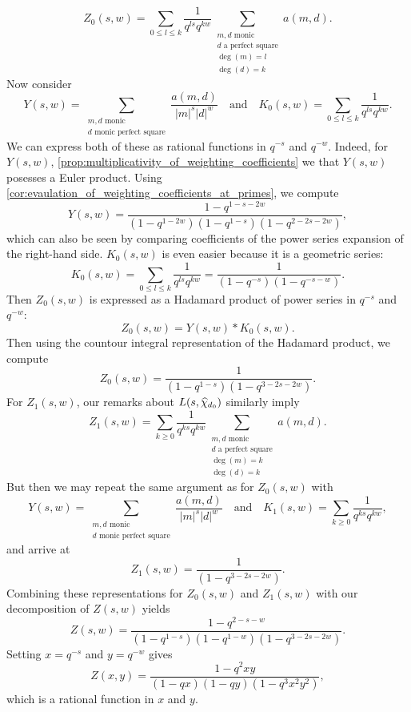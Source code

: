 \documentclass[12pt,reqno,oneside]{amsart}
\begin{document}
    \[
        Z_{0}(s,w) = \sum_{0 \le l \le k}\frac{1}{q^{ls}q^{kw}}\sum_{\substack{\text{$m,d$ monic} \\ \text{$d$ a perfect square} \\ \deg(m) = l \\ \deg(d) = k}}a(m,d).
    \]
    Now consider
    \[
        Y(s,w) = \sum_{\substack{\text{$m,d$ monic} \\ \text{$d$ monic perfect square}}}\frac{a(m,d)}{|m|^{s}|d|^{w}} \quad \text{and} \quad K_{0}(s,w) = \sum_{0 \le l \le k}\frac{1}{q^{ls}q^{kw}}.
    \]
    We can express both of these as rational functions in $q^{-s}$ and $q^{-w}$. Indeed, for $Y(s,w)$, \cref{prop:multiplicativity_of_weighting_coefficients}  we that $Y(s,w)$ posesses a Euler product. Using \cref{cor:evaulation_of_weighting_coefficients_at_primes}, we compute
    \[
        Y(s,w) = \frac{1-q^{1-s-2w}}{(1-q^{1-2w})(1-q^{1-s})(1-q^{2-2s-2w})},
    \]
    which can also be seen by comparing coefficients of the power series expansion of the right-hand side. $K_{0}(s,w)$ is even easier because it is a geometric series:
    \[
        K_{0}(s,w) = \sum_{0 \le l \le k}\frac{1}{q^{ls}q^{kw}} = \frac{1}{(1-q^{-s})(1-q^{-s-w})}.
    \]
    Then $Z_{0}(s,w)$ is expressed as a Hadamard product of power series in $q^{-s}$ and $q^{-w}$:
    \[
        Z_{0}(s,w) = Y(s,w) \ast K_{0}(s,w).
    \]
    Then using the countour integral representation of the Hadamard product, we compute
    \[
        Z_{0}(s,w) = \frac{1}{(1-q^{1-s})(1-q^{3-2s-2w})}.
    \]
    For $Z_{1}(s,w)$, our remarks about $L(s,\widehat{\chi}_{d_{0}})$ similarly imply
    \[
        Z_{1}(s,w) = \sum_{k \ge 0}\frac{1}{q^{ks}q^{kw}}\sum_{\substack{\text{$m,d$ monic} \\ \text{$d$ a perfect square} \\ \deg(m) = k \\ \deg(d) = k}}a(m,d).
    \]
    But then we may repeat the same argument as for $Z_{0}(s,w)$ with
    \[
        Y(s,w) = \sum_{\substack{\text{$m,d$ monic} \\ \text{$d$ monic perfect square}}}\frac{a(m,d)}{|m|^{s}|d|^{w}} \quad \text{and} \quad K_{1}(s,w) = \sum_{k \ge 0}\frac{1}{q^{ks}q^{kw}},
    \]
    and arrive at
    \[
        Z_{1}(s,w) = \frac{1}{(1-q^{3-2s-2w})}.
    \]
    Combining these representations for $Z_{0}(s,w)$ and $Z_{1}(s,w)$ with our decomposition of $Z(s,w)$ yields
    \[
        Z(s,w) = \frac{1-q^{2-s-w}}{(1-q^{1-s})(1-q^{1-w})(1-q^{3-2s-2w})}.
    \]
    Setting $x = q^{-s}$ and $y = q^{-w}$ gives
    \[
        Z(x,y) = \frac{1-q^{2}xy}{(1-qx)(1-qy)(1-q^{3}x^{2}y^{2})},
    \]
    which is a rational function in $x$ and $y$.
\end{document}
